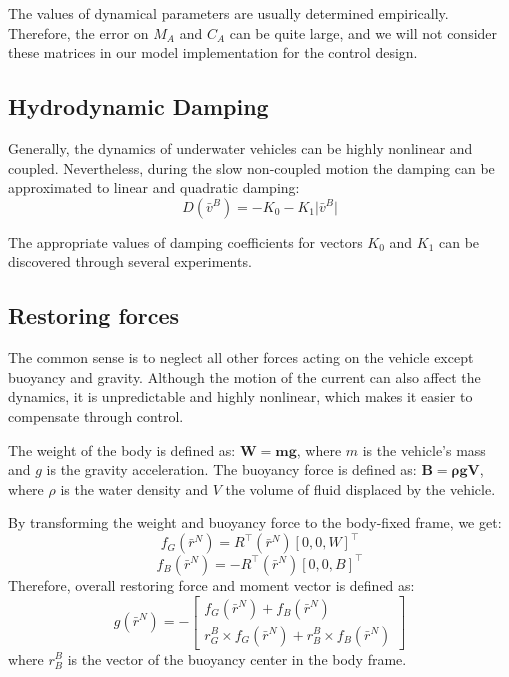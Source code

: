     The values of dynamical parameters are usually determined
    empirically. Therefore, the error on $M_A$ and $C_A$ can be quite large, and we will not consider
    these matrices in our model implementation for the control design.

\subsection{Hydrodynamic Damping}

    Generally, the dynamics of underwater vehicles can be highly nonlinear and coupled.
    Nevertheless, during the slow non-coupled motion the damping can be approximated to linear and quadratic damping:
    \begin{equation}
        D(\bar{v}^B)=-K_{0} - K_{1}\lvert \bar{v}^B \rvert
    \end{equation}

    The appropriate values of damping coefficients for vectors $K_{0}$ and $K_{1}$ can be discovered through several experiments.

\subsection{Restoring forces}

    The common sense is to neglect all other forces acting on the vehicle except buoyancy and gravity. 
    Although the motion of the current can also affect the dynamics, it is unpredictable and highly nonlinear, 
    which makes it easier to compensate through control.

    The weight of the body is defined as: $\mathbf{W=mg}$, where $m$ is the vehicle's mass and $g$ is the gravity acceleration. 
    The buoyancy force is defined as: $\mathbf{B=\boldsymbol{\rho} g V}$, where $\rho$ 
    is the water density and $V$ the volume of fluid displaced by the vehicle. 
    
    By transforming the weight and buoyancy force to the body-fixed frame, we get:
    \begin{equation}
        f_G\left(\bar{r}^N\right)=R^{\top}\left(\bar{r}^N\right)\left[
        0, 
        0, 
        W
        \right]^\top
    \end{equation}
    \begin{equation}
        f_B\left(\bar{r}^N\right)=-R^{\top}\left(\bar{r}^N\right)\left[
        0, 
        0, 
        B
        \right]^\top
    \end{equation}
    Therefore, overall restoring force and moment vector is defined as:
    \begin{equation}
        g(\bar{r}^N)=-\left[\begin{array}{c}
        f_G(\bar{r}^N)+f_B(\bar{r}^N) \\
        r_G^B \times f_G(\bar{r}^N)+r_B^B \times f_B(\bar{r}^N)
        \end{array}\right]
    \end{equation}
    where $r_B^B$ is the vector of the buoyancy center in the body frame. 

